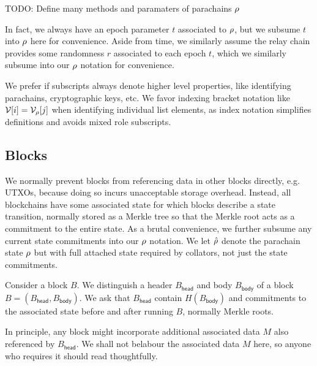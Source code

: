 TODO: Define many methods and paramaters of parachains $\rho$

In fact, we always have an epoch parameter $t$ associated to $\rho$, but we subsume $t$ into $\rho$ here for convenience.  Aside from time, we similarly assume the relay chain provides some randomness $r$ associated to each epoch $t$, which we similarly subsume into our $\rho$ notation for convenience.

We prefer if subscripts always denote higher level properties, like identifying parachains, cryptographic keys, etc.  We favor indexing bracket notation like $\mathcal{V}[i] = \mathcal{V}_{\rho}[j]$ when identifying individual list elements, as index notation simplifies definitions and avoids mixed role subscripts. 

\subsection{Blocks}

We normally prevent blocks from referencing data in other blocks directly, e.g. UTXOs, because doing so incurs unacceptable storage overhead.  Instead, all blockchains have some associated state for which blocks describe a state transition, normally stored as a Merkle tree so that the Merkle root acts as a commitment to the entire state.  As a brutal convenience, we further subsume any current state commitments into our $\rho$ notation.  We let $\hat{\rho}$ denote the parachain state $\rho$ but with full attached state required by collators, not just the state commitments. 

Consider a block $B$.  We distinguish a header $B_{\mathsf{head}}$ and body $B_{\mathsf{body}}$ of a block $B = (B_{\mathsf{head}},B_{\mathsf{body}})$.  We ask that $B_{\mathsf{head}}$ contain $H(B_{\mathsf{body}})$ and commitments to the associated state before and after running $B$, normally Merkle roots.  

In principle, any block might incorporate additional associated data $M$ also referenced by $B_{\mathsf{head}}$.  We shall not belabour the associated data $M$ here, so anyone who requires it should read thoughtfully.

